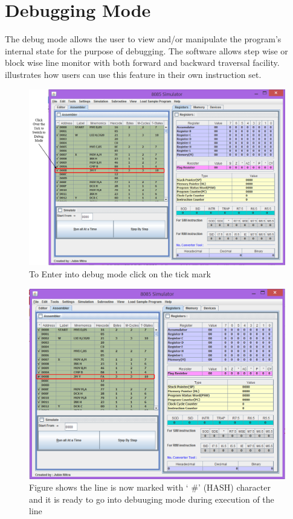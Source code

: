 \chapter{Debugging Mode}
The debug mode allows the user to view and/or manipulate the program's internal state for the purpose of debugging. The software allows step wise or block wise line monitor with both forward and backward traversal facility.  illustrates how users can use this feature in their own instruction set.
\begin{figure}[htbp]
	\centering 
	\includegraphics[width=0.9\linewidth]{./Debug_1.png}
	\caption{To Enter into debug mode click on the tick mark}
	\label{fig:debug:click}
\end{figure}

\begin{figure}[htbp]
	\centering 
	\includegraphics[width=0.9\linewidth]{./Debug_2.png}
	\caption{Figure shows the line is now marked with ` \#' (HASH) character and it is ready to go into debuuging mode during execution of the line}
	\label{fig:debug:hash}
\end{figure}

